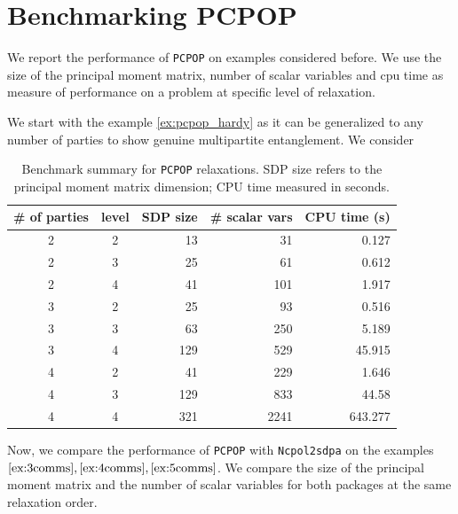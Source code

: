 \section{Benchmarking PCPOP}
\label{sec:benchmark}
We report the performance of \texttt{PCPOP} on examples considered before. We use the size of the principal moment matrix, number of scalar variables and cpu time as measure of performance on a problem at specific level of relaxation.

We start with the example \ref{ex:pcpop_hardy} as it can be generalized to any number of parties to show genuine multipartite entanglement. We consider   

\begin{table}[H]
	\centering
	\caption{Benchmark summary for \texttt{PCPOP} relaxations. SDP size refers to the principal moment matrix dimension; CPU time measured in seconds.}
	\label{tab:pcpop-bench}
	\begin{tabular}{@{}ccrrr@{}}
		\# of parties & level & SDP size & \# scalar vars& CPU time (s) \\
		\midrule
		2 & 2 & 13 & 31 & 0.127 \\
		2 & 3 & 25 & 61 & 0.612 \\
		2 & 4 & 41 & 101 & 1.917 \\
		3 & 2 & 25 & 93 & 0.516 \\
        3 & 3 & 63 & 250 & 5.189 \\
        3 & 4 & 129 & 529 & 45.915 \\
        4 & 2 & 41 & 229 & 1.646 \\
        4 & 3 & 129 & 833 & 44.58 \\
        4 & 4 & 321 & 2241 & 643.277 \\ 
		\bottomrule
	\end{tabular}
\end{table}
Now, we compare the performance of \texttt{PCPOP} with \texttt{Ncpol2sdpa} on the examples $\ref{ex:3comms},\ref{ex:4comms},\ref{ex:5comms}$. We compare the size of the principal moment matrix and the number of scalar variables for both packages at the same relaxation order.
